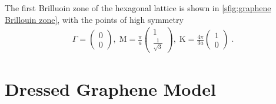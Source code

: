 \documentclass[../notes.tex]{subfiles}
\begin{document}
The first Brilluoin zone of the hexagonal lattice is shown in \cref{sfig:graphene Brillouin zone}, with the points of high symmetry
\begin{align}
	\Gamma = \begin{pmatrix} 0 \\ 0 \end{pmatrix},\;
	\mathrm{M} = \frac{\pi}{a} \begin{pmatrix} 1 \\ \frac{1}{\sqrt{3}} \end{pmatrix},\;
	\mathrm{K} = \frac{4\pi}{3 a} \begin{pmatrix} 1 \\ 0 \end{pmatrix}\;.
\end{align}


\section{Dressed Graphene Model}\label{sec:dressed graphene model}
\end{document}

